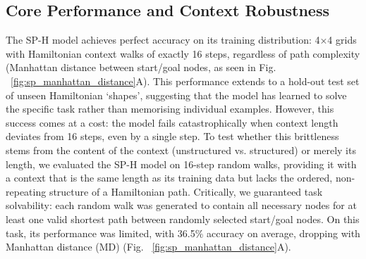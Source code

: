 
\subsection{Core Performance and Context Robustness}

The SP-H model achieves perfect accuracy on its training distribution: 4×4 grids with Hamiltonian context walks of exactly 16 steps, regardless of path complexity (Manhattan distance between start/goal nodes, as seen in Fig. ~\ref{fig:sp_manhattan_distance}A). This performance extends to a hold-out test set of unseen Hamiltonian `shapes', suggesting that the model has learned to solve the specific task rather than memorising individual examples. However, this success comes at a cost: the model fails catastrophically when context length deviates from 16 steps, even by a single step. To test whether this brittleness stems from the content of the context (unstructured vs. structured) or merely its length, we evaluated the SP-H model on 16-step random walks, providing it with a context that is the same length as its training data but lacks the ordered, non-repeating structure of a Hamiltonian path. Critically, we guaranteed task solvability: each random walk was generated to contain all necessary nodes for at least one valid shortest path between randomly selected start/goal nodes. On this task, its performance was limited, with 36.5\% accuracy on average, dropping with Manhattan distance (MD) (Fig. ~\ref{fig:sp_manhattan_distance}A).

